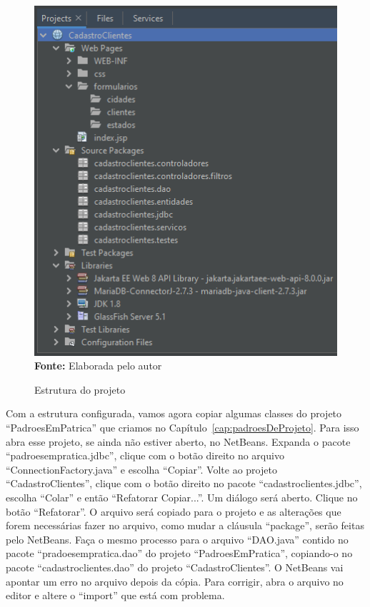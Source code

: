 \FloatBarrier
\begin{figure}[!htbp]
    \centering
    \caption{Estrutura do projeto}
    \includegraphics[scale=0.8]{imagens/cap05EstruturaProjeto}
    \\\textbf{Fonte:} Elaborada pelo autor
    \label{fig:cap05EstruturaProjeto}
\end{figure}
\FloatBarrier

Com a estrutura configurada, vamos agora copiar algumas classes do projeto ``PadroesEmPatrica'' que criamos no Capítulo~\ref{cap:padroesDeProjeto}. Para isso abra esse projeto, se ainda não estiver aberto, no NetBeans. Expanda o pacote ``padroesempratica.jdbc'', clique com o botão direito no arquivo ``ConnectionFactory.java'' e escolha ``Copiar''. Volte ao projeto ``CadastroClientes'', clique com o botão direito no pacote ``cadastroclientes.jdbc'', escolha ``Colar'' e então ``Refatorar Copiar...''. Um diálogo será aberto. Clique no botão ``Refatorar''. O arquivo será copiado para o projeto e as alterações que forem necessárias fazer no arquivo, como mudar a cláusula ``package'', serão feitas pelo NetBeans. Faça o mesmo processo para o arquivo ``DAO.java'' contido no pacote ``pradoesempratica.dao'' do projeto ``PadroesEmPratica'', copiando-o no pacote ``cadastroclientes.dao'' do projeto ``CadastroClientes''. O NetBeans vai apontar um erro no arquivo depois da cópia. Para corrigir, abra o arquivo no editor e altere o ``import'' que está com problema. 

